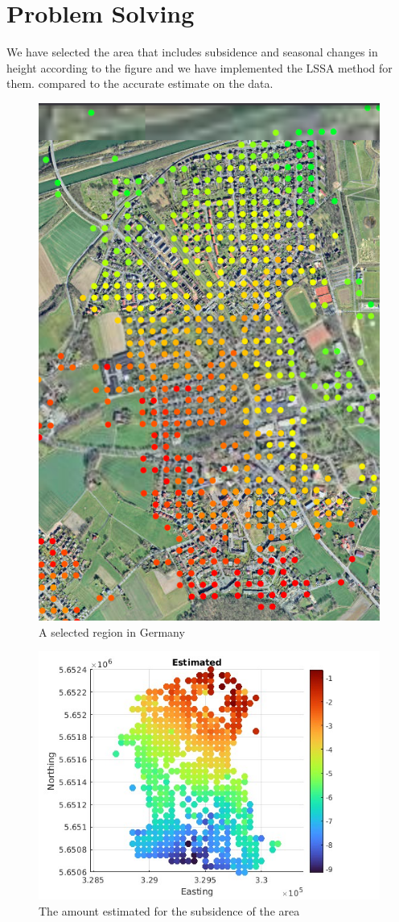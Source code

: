 \documentclass[12pt]{article}
\begin{document}
\section{Problem Solving}
We have selected the area that includes subsidence and seasonal changes in height according to the figure and we have implemented the LSSA method for them. compared to the accurate estimate on the data.
\begin{figure}[h!]
    \centering
    \includegraphics[width=0.3\linewidth]{img/Area}
    \caption{A selected region in Germany}
    \label{fig:dynamicprogramming}
\end{figure}


\begin{figure}[h!]
    \centering
    \includegraphics[width=0.6\linewidth]{img/Real}
    \caption{The amount estimated for the subsidence of the area}
    \label{fig:dynamicprogramming}
\end{figure}
\end{document}
